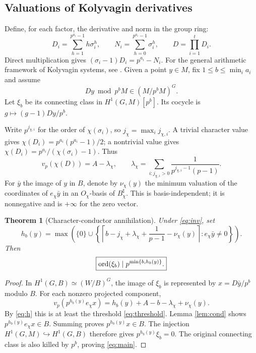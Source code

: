 \documentclass[11pt]{article}
\newtheorem{theorem}{Theorem}[section]
\theoremstyle{definition}\newtheorem{definition}[theorem]{Definition}\newtheorem{example}[theorem]{Example}
\theoremstyle{remark}\newtheorem{remark}[theorem]{Remark}
\begin{document}
\subsection{Valuations of Kolyvagin derivatives}
Define, for each factor, the derivative and norm in the group ring:
\[
 D_i=\sum_{h=1}^{p^{a_i}-1}h\sigma_i^h,\qquad
 N_i=\sum_{h=0}^{p^{a_i}-1}\sigma_i^h,\qquad D=\prod_{i=1}^tD_i.
\]
Direct multiplication gives $(\sigma_i-1)D_i=p^{a_i}-N_i$. For the general arithmetic framework of Kolyvagin systems, see \cite{mr}. Given a point $y\in M$, fix $1\le b\le\min_i a_i$ and assume
\begin{equation}\label{eq:inv}
 Dy\bmod p^bM\in(M/p^bM)^G.
\end{equation}
Let $\xi_b$ be its connecting class in $H^1(G,M)[p^b]$. Its cocycle is $g\mapsto (g-1)Dy/p^b$.

Write $p^{j_{\chi,i}}$ for the order of $\chi(\sigma_i)$, so $j_\chi=\max_i j_{\chi,i}$. A trivial character value gives $\chi(D_i)=p^{a_i}(p^{a_i}-1)/2$; a nontrivial value gives $\chi(D_i)=p^{a_i}/(\chi(\sigma_i)-1)$. Thus
\begin{equation}\label{eq:loss}
 v_p(\chi(D))=A-\lambda_\chi,\qquad
 \lambda_\chi=\sum_{i:j_{\chi,i}>0}\frac{1}{p^{j_{\chi,i}-1}(p-1)}.
\end{equation}
For $\bar y$ the image of $y$ in $B$, denote by $\nu_\chi(y)$ the minimum valuation of the coordinates of $e_\chi\bar y$ in an $O_\chi$-basis of $B^\sharp_\chi$. This is basis-independent; it is nonnegative and is $+\infty$ for the zero vector.

\begin{theorem}[Character-conductor annihilation]\label{thm:bound}
Under \eqref{eq:inv}, set
\begin{equation}\label{eq:h}
 h_b(y)=\max\left(\{0\}\cup\left\{
 \left\lceil b-j_\chi+\lambda_\chi+\frac1{p-1}-\nu_\chi(y)\right\rceil:
 e_\chi\bar y\ne0\right\}\right).
\end{equation}
Then
\begin{equation}\label{eq:main}
 \boxed{\operatorname{ord}(\xi_b)\mid p^{\min\{b,h_b(y)\}}.}
\end{equation}
\end{theorem}
\begin{proof}
In $H^1(G,B)\simeq (W/B)^G$, the image of $\xi_b$ is represented by $x=D\bar y/p^b$ modulo $B$. For each nonzero projected component,
\[
 v_p(p^{h_b(y)}e_\chi x)=h_b(y)+A-b-\lambda_\chi+\nu_\chi(y).
\]
By \eqref{eq:h} this is at least the threshold \eqref{eq:threshold}. Lemma \ref{lem:cond} shows $p^{h_b(y)}e_\chi x\in B$. Summing proves $p^{h_b(y)}x\in B$. The injection $H^1(G,M)\hookrightarrow H^1(G,B)$ therefore gives $p^{h_b(y)}\xi_b=0$. The original connecting class is also killed by $p^b$, proving \eqref{eq:main}.
\end{proof}
\end{document}
